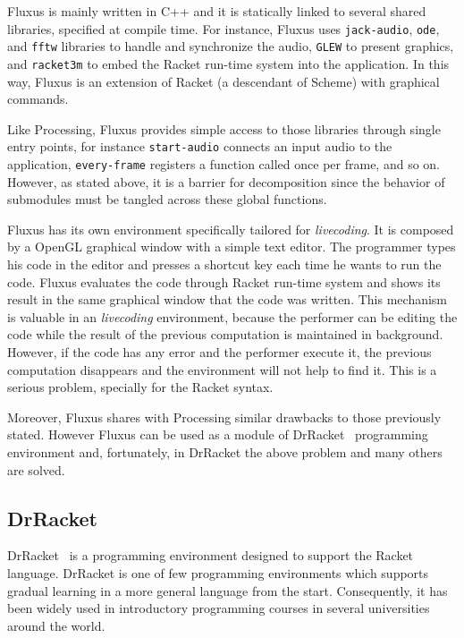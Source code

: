 Fluxus is mainly written in C++ and it is statically linked to several shared libraries, specified at compile time. For instance, Fluxus uses \texttt{jack-audio}, \texttt{ode}, and \texttt{fftw} libraries to handle and synchronize the audio, \texttt{GLEW} to present graphics, and \texttt{racket3m} to embed the Racket run-time system into the application. In this way, Fluxus is an extension of Racket (a descendant of Scheme) with graphical commands.

Like Processing, Fluxus provides simple access to those libraries through single entry points, for instance \texttt{start-audio} connects an input audio to the application, \texttt{every-frame} registers a function called once per frame, and so on. However, as stated above, it is a barrier for decomposition since the behavior of submodules must be tangled across these global functions.

Fluxus has its own environment specifically tailored for \textit{livecoding}. It is composed by a OpenGL graphical window with a simple text editor. The programmer types his code in the editor and presses a shortcut key each time he wants to run the code. Fluxus evaluates the code through Racket run-time system and shows its result in the same graphical window that the code was written. This mechanism is valuable in an \textit{livecoding} environment, because the performer can be editing the code while the result of the previous computation is maintained in background. However, if the code has any error and the performer execute it, the previous computation disappears and the environment will not help to find it. This is a serious problem, specially for the Racket syntax.

Moreover, Fluxus shares with Processing similar drawbacks to those previously stated. However Fluxus can be used as a module of DrRacket~\cite{findler2002drscheme} programming environment and, fortunately, in DrRacket the above problem and many others are solved.
\subsection{DrRacket}
\label{subsec:drracket}
DrRacket~\cite{findler2002drscheme} is a programming environment designed to support the Racket language. DrRacket is one of few programming environments which supports gradual learning in a more general language from the start. Consequently, it has been widely used in introductory programming courses in several universities around the world.

